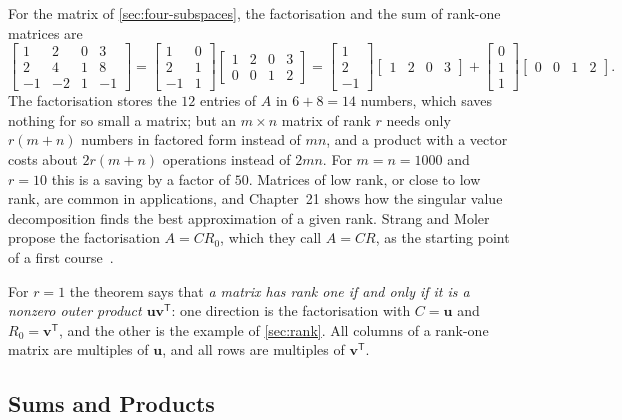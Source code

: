 For the matrix of \cref{sec:four-subspaces}, the factorisation and the sum of rank-one matrices are
\[
\begin{bmatrix}1&2&0&3\\2&4&1&8\\-1&-2&1&-1\end{bmatrix}
=\begin{bmatrix}1&0\\2&1\\-1&1\end{bmatrix}\begin{bmatrix}1&2&0&3\\0&0&1&2\end{bmatrix}
=\begin{bmatrix}1\\2\\-1\end{bmatrix}\begin{bmatrix}1&2&0&3\end{bmatrix}+\begin{bmatrix}0\\1\\1\end{bmatrix}\begin{bmatrix}0&0&1&2\end{bmatrix}.
\]
The factorisation stores the $12$ entries of $A$ in $6+8=14$ numbers, which saves nothing for so small a matrix; but an $m\times n$ matrix of rank $r$ needs only $r(m+n)$ numbers in factored form instead of $mn$, and a product with a vector costs about $2r(m+n)$ operations instead of $2mn$. For $m=n=1000$ and $r=10$ this is a saving by a factor of $50$. Matrices of low rank, or close to low rank, are common in applications, and Chapter~21 shows how the singular value decomposition finds the best approximation of a given rank. Strang and Moler propose the factorisation $A=CR_0$, which they call $A=CR$, as the starting point of a first course~\cite{strang2022}.

For $r=1$ the theorem says that \emph{a matrix has rank one if and only if it is a nonzero outer product $\mathbf u\mathbf v^{\mathsf T}$}: one direction is the factorisation with $C=\mathbf u$ and $R_0=\mathbf v^{\mathsf T}$, and the other is the example of \cref{sec:rank}. All columns of a rank-one matrix are multiples of $\mathbf u$, and all rows are multiples of $\mathbf v^{\mathsf T}$.

\subsection{Sums and Products}

